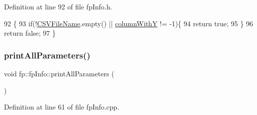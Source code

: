 Definition at line 92 of file fp\+Info.\+h.


\begin{DoxyCode}
92                                          \{
93                 \textcolor{keywordflow}{if}(!\hyperlink{classfp_1_1fpInfo_aac01e5ddb27bc333e172a0422066af1c}{CSVFileName}.empty() || \hyperlink{classfp_1_1fpInfo_ac29e135cd84cdef547b678e7ea37f92d}{columnWithY} != -1)\{
94                     \textcolor{keywordflow}{return} \textcolor{keyword}{true};
95                 \}
96                 \textcolor{keywordflow}{return} \textcolor{keyword}{false};
97             \}
\end{DoxyCode}
\mbox{\label{classfp_1_1fpInfo_a471bd46c828547d5b556f6f4e9fca70f}} 
\subsubsection{\texorpdfstring{print\+All\+Parameters()}{printAllParameters()}}
{\footnotesize\ttfamily void fp\+::fp\+Info\+::print\+All\+Parameters (\begin{DoxyParamCaption}{ }\end{DoxyParamCaption})}



Definition at line 61 of file fp\+Info.\+cpp.


